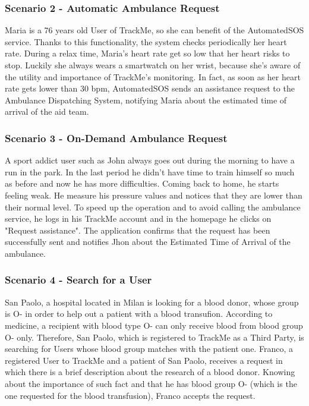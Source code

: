 \documentclass[12pt,a4paper]{article}
\begin{document}
	\subsubsection*{Scenario 2 - Automatic Ambulance Request}
		Maria is a 76 years old User of TrackMe, so she can benefit of the AutomatedSOS service. Thanks to this functionality, the system checks periodically her heart rate. During a relax time, Maria's heart rate get so low that her heart risks to stop. Luckily she always wears a smartwatch on her wrist, because she's aware of the utility and importance of TrackMe's monitoring. In fact, as soon as her heart rate gets lower than 30 bpm, AutomatedSOS sends an assistance request to the Ambulance Dispatching System, notifying Maria about the estimated time of arrival of the aid team.

	\subsubsection*{Scenario 3 - On-Demand Ambulance Request}
		A sport addict user such as John always goes out during the morning to have a run in the park.
		In the last period he didn't have time to train himself so much as before and now he has more difficulties. Coming back to home, he starts feeling weak. He measure his pressure values and notices that they are lower than their normal level. To speed up the operation and to avoid calling the ambulance service, he logs in his TrackMe account and in the homepage he clicks on "Request assistance". The application confirms that the request has been successfully sent and notifies Jhon about the Estimated Time of Arrival of the ambulance.

	\subsubsection*{Scenario 4 - Search for a User}
		San Paolo, a hospital located in Milan is looking for a blood donor, whose  group is O- in order to help out a patient with a blood transufion. According to medicine, a recipient with blood type O- can only receive blood from blood group O- only. Therefore, San Paolo, which is registered to TrackMe as a Third Party, is searching for Users whose blood group matches with the patient one.
		Franco, a registered User to TrackMe and a patient of San Paolo, receives a request in which there is a brief description about the research of a blood donor. Knowing about the importance of such fact and that he has blood group O- (which is the one requested for the blood transfusion), Franco accepts the request.
\end{document}
